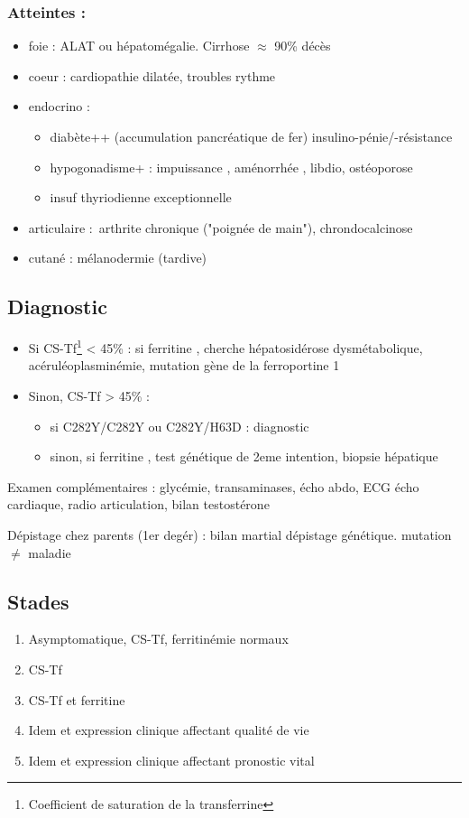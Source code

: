 \documentclass[11pt]{article}
\begin{document}
\subsubsection{Atteintes :}
\label{sec:orga0e7bda}
\begin{itemize}
\item foie : \inc ALAT ou hépatomégalie. Cirrhose \(\approx\) 90\% décès
\item coeur : cardiopathie dilatée, troubles rythme
\item endocrino :
\begin{itemize}
\item diabète++ (accumulation pancréatique de fer) insulino-pénie/-résistance
\item hypogonadisme+ : impuissance \male, aménorrhée \female, \dec libdio,
ostéoporose
\item insuf thyriodienne exceptionnelle
\end{itemize}
\item articulaire : arthrite chronique ("poignée de main"), chrondocalcinose
\item cutané : mélanodermie (tardive)
\end{itemize}


\subsection{Diagnostic}
\label{sec:orga1fd7cc}
\begin{itemize}
\item Si CS-Tf\footnote{Coefficient de saturation de la transferrine} < 45\% : si ferritine \inc, cherche hépatosidérose dysmétabolique,
acéruléoplasminémie, mutation gène de la ferroportine 1
\item Sinon, CS-Tf > 45\% : 
\begin{itemize}
\item si C282Y/C282Y ou C282Y/H63D : diagnostic
\item sinon, si ferritine \inc, test génétique de 2eme intention, biopsie
hépatique
\end{itemize}
\end{itemize}

Examen complémentaires : glycémie, transaminases, écho abdo, ECG \textpm{} écho
cardiaque, radio articulation, bilan testostérone

Dépistage chez parents (1er degér) : bilan martial \textpm{} dépistage
génétique. \danger mutation \(\neq\) maladie

\subsection{Stades}
\label{sec:org1a699ed}
\begin{enumerate}
\item Asymptomatique, CS-Tf, ferritinémie normaux
\item CS-Tf \inc
\item CS-Tf \inc et ferritine \inc
\item Idem et expression clinique affectant qualité de vie
\item Idem et expression clinique affectant pronostic vital
\end{enumerate}
\end{document}
